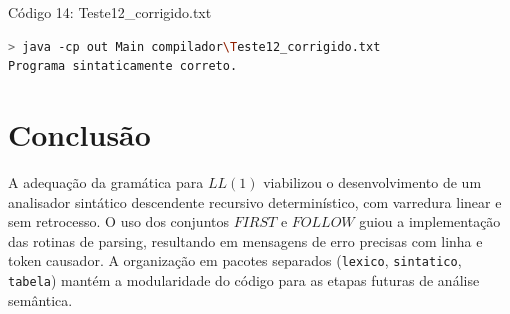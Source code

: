 \documentclass[12pt,a4paper]{article}
\begin{document}
Código 14: Teste12\_corrigido.txt

\begin{lstlisting}[language=bash]
> java -cp out Main compilador\Teste12_corrigido.txt
Programa sintaticamente correto.
\end{lstlisting}

\section{Conclusão}

A adequação da gramática para $LL(1)$ viabilizou o desenvolvimento de um analisador sintático descendente recursivo determinístico, com varredura linear e sem retrocesso. O uso dos conjuntos $FIRST$ e $FOLLOW$ guiou a implementação das rotinas de parsing, resultando em mensagens de erro precisas com linha e token causador. A organização em pacotes separados (\texttt{lexico}, \texttt{sintatico}, \texttt{tabela}) mantém a modularidade do código para as etapas futuras de análise semântica.
\end{document}
